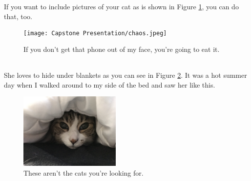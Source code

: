 \documentclass{article}
\begin{document}

If you want to include pictures of your cat as is shown in Figure \ref{fig:chaos}, you can do that, too.
\begin{figure}
    \centering
    \texttt{[image: Capstone Presentation/chaos.jpeg]}
    \caption{If you don't get that phone out of my face, you're going to eat it.}
    \label{fig:chaos}
\end{figure}
\\

She loves to hide under blankets as you can see in Figure \ref{fig:youcantseeme}. It was a hot summer day when I walked around to my side of the bed and saw her like this.
\begin{figure}
    \centering
    \includegraphics[width=5cm]{Capstone Presentation/youcantseeme.jpeg}
    \caption{These aren't the cats you're looking for.}
    \label{fig:youcantseeme}
\end{figure}
\end{document}
